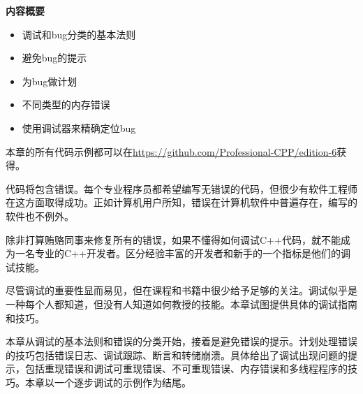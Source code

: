 \noindent
\textbf{内容概要}

\begin{itemize}
\item
调试和bug分类的基本法则

\item
避免bug的提示

\item
为bug做计划

\item
不同类型的内存错误

\item
使用调试器来精确定位bug
\end{itemize}

本章的所有代码示例都可以在\url{https://github.com/Professional-CPP/edition-6}获得。

代码将包含错误。每个专业程序员都希望编写无错误的代码，但很少有软件工程师在这方面取得成功。正如计算机用户所知，错误在计算机软件中普遍存在，编写的软件也不例外。

除非打算贿赂同事来修复所有的错误，如果不懂得如何调试C++代码，就不能成为一名专业的C++开发者。区分经验丰富的开发者和新手的一个指标是他们的调试技能。

尽管调试的重要性显而易见，但在课程和书籍中很少给予足够的关注。调试似乎是一种每个人都知道，但没有人知道如何教授的技能。本章试图提供具体的调试指南和技巧。

本章从调试的基本法则和错误的分类开始，接着是避免错误的提示。计划处理错误的技巧包括错误日志、调试跟踪、断言和转储崩溃。具体给出了调试出现问题的提示，包括重现错误和调试可重现错误、不可重现错误、内存错误和多线程程序的技巧。本章以一个逐步调试的示例作为结尾。

